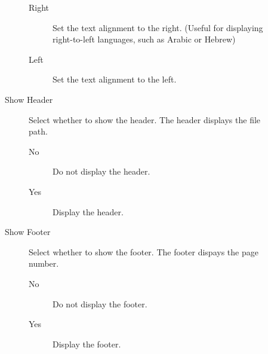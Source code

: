 \begin{description}
\begin{description}
        \begin{description}
            \item[Right] Set the text alignment to the right.
            (Useful for displaying right-to-left languages, such as Arabic or Hebrew)
            \item[Left] Set the text alignment to the left.
        \end{description}
    \item[Show Header] Select whether to show the header. The header displays the file path.
        \begin{description}
            \item[No] Do not display the header.
            \item[Yes] Display the header.
        \end{description}
    \item[Show Footer] Select whether to show the footer. The footer dispays the page number.
        \begin{description}
            \item[No] Do not display the footer.
            \item[Yes] Display the footer.
        \end{description}


\end{description}
\end{description}
